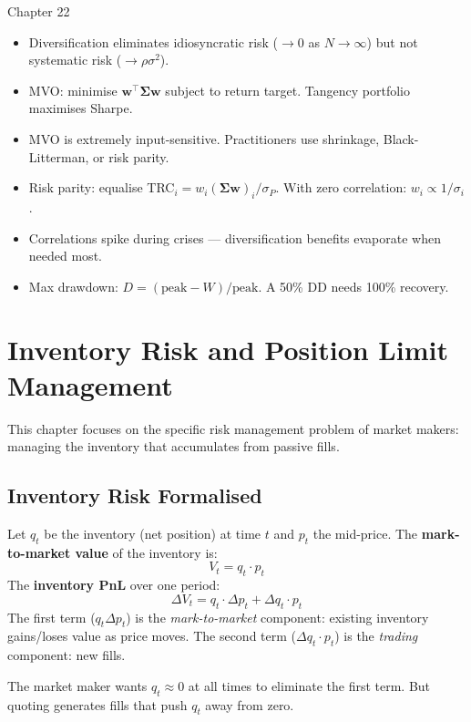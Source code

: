 \documentclass[12pt,a4paper,openany]{report}
\theoremstyle{definition}
\begin{document}
\begin{takeawaybox}{Chapter 22}
\begin{itemize}
  \item Diversification eliminates idiosyncratic risk ($\to 0$ as $N \to \infty$) but not systematic risk ($\to \rho\sigma^2$).
  \item MVO: minimise $\mathbf{w}^\top\boldsymbol{\Sigma}\mathbf{w}$ subject to return target. Tangency portfolio maximises Sharpe.
  \item MVO is extremely input-sensitive. Practitioners use shrinkage, Black-Litterman, or risk parity.
  \item Risk parity: equalise TRC$_i = w_i(\boldsymbol{\Sigma}\mathbf{w})_i/\sigma_P$. With zero correlation: $w_i \propto 1/\sigma_i$.
  \item Correlations spike during crises — diversification benefits evaporate when needed most.
  \item Max drawdown: $D = (\text{peak} - W)/\text{peak}$. A 50\% DD needs 100\% recovery.
\end{itemize}
\end{takeawaybox}

\chapter{Inventory Risk and Position Limit Management}

This chapter focuses on the specific risk management problem of market makers: managing the inventory that accumulates from passive fills.

\section{Inventory Risk Formalised}

Let $q_t$ be the inventory (net position) at time $t$ and $p_t$ the mid-price. The \textbf{mark-to-market value} of the inventory is:
\[
  V_t = q_t \cdot p_t
\]
The \textbf{inventory PnL} over one period:
\begin{equation}
  \Delta V_t = q_t \cdot \Delta p_t + \Delta q_t \cdot p_t
\end{equation}
The first term ($q_t \Delta p_t$) is the \emph{mark-to-market} component: existing inventory gains/loses value as price moves. The second term ($\Delta q_t \cdot p_t$) is the \emph{trading} component: new fills.

The market maker wants $q_t \approx 0$ at all times to eliminate the first term. But quoting generates fills that push $q_t$ away from zero.
\end{document}
